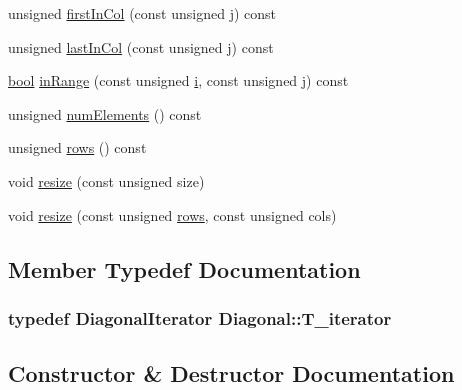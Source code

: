 \begin{DoxyCompactItemize}
unsigned \hyperlink{classDiagonal_a38e9c0120b9f55172d8e087309466591}{first\+In\+Col} (const unsigned \hyperlink{indexexpr_8h_aa1f3325d66516548e69238097857fa98}{j}) const 
\item 
unsigned \hyperlink{classDiagonal_aa990aa51399f7477b34f0e6108e2a67e}{last\+In\+Col} (const unsigned \hyperlink{indexexpr_8h_aa1f3325d66516548e69238097857fa98}{j}) const 
\item 
\hyperlink{compiler_8h_abb452686968e48b67397da5f97445f5b}{bool} \hyperlink{classDiagonal_ad5d65cfb23b1d45b7d5d376e00e4cace}{in\+Range} (const unsigned \hyperlink{indexexpr_8h_aabd77643995707c185e95c8cb2782c81}{i}, const unsigned \hyperlink{indexexpr_8h_aa1f3325d66516548e69238097857fa98}{j}) const 
\item 
unsigned \hyperlink{classDiagonal_adedf6df0a7088a26654f5a03da8ae575}{num\+Elements} () const 
\item 
unsigned \hyperlink{classDiagonal_abe0c77c7f3563dc0d27fc051f046b083}{rows} () const 
\item 
void \hyperlink{classDiagonal_a9a88629dea80fe9c6694a0ee08fbddbc}{resize} (const unsigned size)
\item 
void \hyperlink{classDiagonal_a86332b5c95895a0bc57b58f5d8952a70}{resize} (const unsigned \hyperlink{classDiagonal_abe0c77c7f3563dc0d27fc051f046b083}{rows}, const unsigned cols)
\end{DoxyCompactItemize}


\subsection{Member Typedef Documentation}
\hypertarget{classDiagonal_a10d1f6944fa52a0d07a64e82791e35ad}{}
\subsubsection[{T\+\_\+iterator}]{\setlength{\rightskip}{0pt plus 5cm}typedef {\bf Diagonal\+Iterator} {\bf Diagonal\+::\+T\+\_\+iterator}}\label{classDiagonal_a10d1f6944fa52a0d07a64e82791e35ad}


\subsection{Constructor \& Destructor Documentation}
\hypertarget{classDiagonal_a8a0fb301083ec1d68055d4ac8a460fc9}{}
